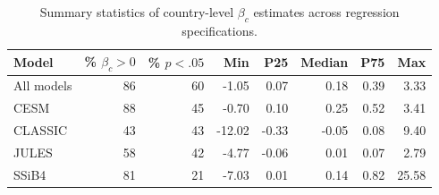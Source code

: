 \begin{table}[ht]
\centering
\caption{Summary statistics of country-level $\beta_c$ estimates across regression specifications.} 
\label{tab:beta_summary}
\begin{tabular}{lrrrrrrr}
  \toprule
Model & \% $\beta_c > 0$ & \% $p < .05$ & Min & P25 & Median & P75 & Max \\ 
  \midrule
All models & 86 & 60 & -1.05 & 0.07 & 0.18 & 0.39 & 3.33 \\ 
  CESM & 88 & 45 & -0.70 & 0.10 & 0.25 & 0.52 & 3.41 \\ 
  CLASSIC & 43 & 43 & -12.02 & -0.33 & -0.05 & 0.08 & 9.40 \\ 
  JULES & 58 & 42 & -4.77 & -0.06 & 0.01 & 0.07 & 2.79 \\ 
  SSiB4 & 81 & 21 & -7.03 & 0.01 & 0.14 & 0.82 & 25.58 \\ 
   \bottomrule
\end{tabular}
\end{table}
